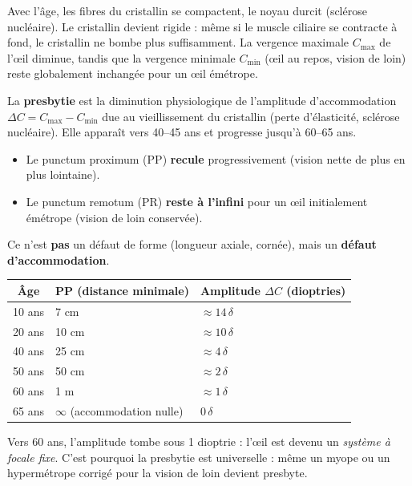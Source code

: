 \documentclass[11pt]{article}
\newcommand{\cle}[1]{{\popxbold\color{popdark}#1}}
\begin{document}
Avec l'âge, les fibres du cristallin se compactent, le noyau durcit (sclérose nucléaire). Le cristallin devient rigide : même si le muscle ciliaire se contracte à fond, le cristallin ne bombe plus suffisamment. La \cle{vergence maximale} $C_{\text{max}}$ de l'œil diminue, tandis que la \cle{vergence minimale} $C_{\text{min}}$ (œil au repos, vision de loin) reste globalement inchangée pour un œil émétrope.

\begin{definition}[Presbytie]
La \textbf{presbytie} est la diminution physiologique de l'amplitude d'accommodation $\Delta C = C_{\text{max}} - C_{\text{min}}$ due au vieillissement du cristallin (perte d'élasticité, sclérose nucléaire). Elle apparaît vers 40--45 ans et progresse jusqu'à 60--65 ans.
\begin{itemize}
    \item Le \cle{punctum proximum} (PP) \textbf{recule} progressivement (vision nette de plus en plus lointaine).
    \item Le \cle{punctum remotum} (PR) \textbf{reste à l'infini} pour un œil initialement émétrope (vision de loin conservée).
\end{itemize}
Ce n'est \textbf{pas} un défaut de forme (longueur axiale, cornée), mais un \textbf{défaut d'accommodation}.
\end{definition}

\begin{savaistu}
\begin{center}
\begin{tabularx}{\linewidth}{|c|X|X|}\hline
\textbf{Âge} & \textbf{PP (distance minimale)} & \textbf{Amplitude $\Delta C$ (dioptries)} \\ \hline
10 ans & 7 cm & $\approx 14\,\delta$ \\
20 ans & 10 cm & $\approx 10\,\delta$ \\
40 ans & 25 cm & $\approx 4\,\delta$ \\
50 ans & 50 cm & $\approx 2\,\delta$ \\
60 ans & 1 m & $\approx 1\,\delta$ \\
65 ans & $\infty$ (accommodation nulle) & $0\,\delta$ \\ \hline
\end{tabularx}
\end{center}
Vers 60 ans, l'amplitude tombe sous 1 dioptrie : l'œil est devenu un \emph{système à focale fixe}. C'est pourquoi la presbytie est universelle : même un myope ou un hypermétrope corrigé pour la vision de loin devient presbyte.
\end{savaistu}
\end{document}
